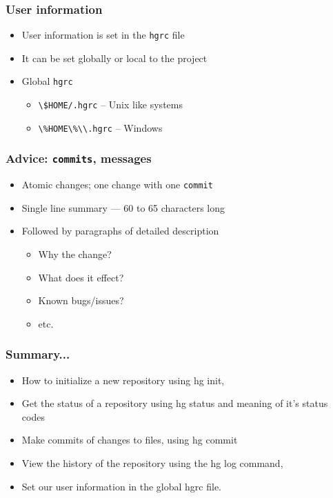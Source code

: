 \documentclass[14pt,compress]{beamer}
\newcommand{\typ}[1]{\lstinline{#1}}
\begin{document}
\begin{frame}
  \frametitle{User information}
  \begin{itemize}
  \item User information is set in the \typ{hgrc} file
  \item It can be set globally or local to the project
  \item Global \typ{hgrc}
    \begin{itemize}
    \item \typ{\$HOME/.hgrc} -- Unix like systems
    \item \typ{\%HOME\%\\.hgrc} -- Windows
    \end{itemize}
  \end{itemize}
\end{frame}

\begin{frame}
  \frametitle{\alert{Advice}: \typ{commits}, messages}
  \begin{itemize}
  \item Atomic changes; one change with one \typ{commit}
  \item Single line summary --- 60 to 65 characters long
  \item Followed by paragraphs of detailed description
    \begin{itemize}
    \item Why the change?
    \item What does it effect?
    \item Known bugs/issues?
    \item etc. 
    \end{itemize}
  \end{itemize}
\end{frame}

\begin{frame}[fragile]
\frametitle{Summary...}
\begin{itemize}
\item How to initialize a new repository using hg init,
\item Get the status of a repository using hg status and meaning of it's status codes
\item Make commits of changes to files, using hg commit 
\item View the history of the repository using the hg log command,
\item Set our user information in the global hgrc file.
\end{itemize}
\end{frame}
\end{document}
